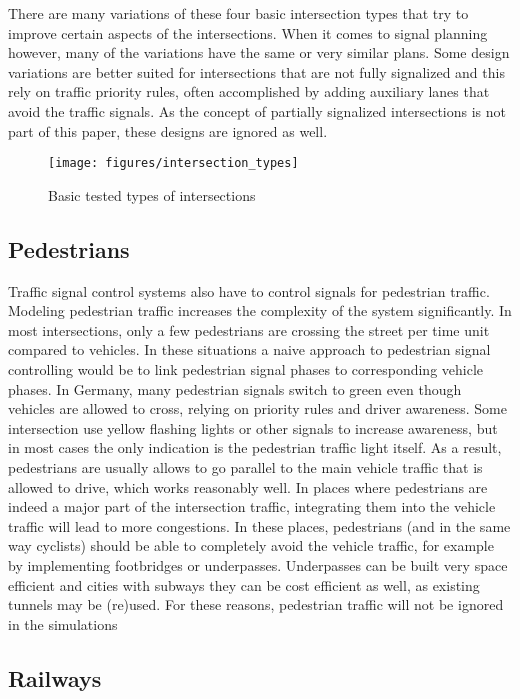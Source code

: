 There are many variations of these four basic intersection types that try to improve certain aspects of the intersections. When it comes to signal planning however, many of the variations have the same or very similar plans. Some design variations are better suited for intersections that are not fully signalized and this rely on traffic priority rules, often accomplished by adding auxiliary lanes that avoid the traffic signals. As the concept of partially signalized intersections is not part of this paper, these designs are ignored as well.

\begin{figure}[ht]
	\centering
	\texttt{[image: figures/intersection\_types]}
	\caption{Basic tested types of intersections}
	\label{intersection_types}
\end{figure}

\subsection*{Pedestrians}

Traffic signal control systems also have to control signals for pedestrian traffic. Modeling pedestrian traffic increases the complexity of the system significantly. In most intersections, only a few pedestrians are crossing the street per time unit compared to vehicles. In these situations a naive approach to pedestrian signal controlling would be to link pedestrian signal phases to corresponding vehicle phases. In Germany, many pedestrian signals switch to green even though vehicles are allowed to cross, relying on priority rules and driver awareness. Some intersection use yellow flashing lights or other signals to increase awareness, but in most cases the only indication is the pedestrian traffic light itself. As a result, pedestrians are usually allows to go parallel to the main vehicle traffic that is allowed to drive, which works reasonably well. In places where pedestrians are indeed a major part of the intersection traffic, integrating them into the vehicle traffic will lead to more congestions. In these places, pedestrians (and in the same way cyclists) should be able to completely avoid the vehicle traffic, for example by implementing footbridges or underpasses. Underpasses can be built very space efficient and cities with subways they can be cost efficient as well, as existing tunnels may be (re)used. For these reasons, pedestrian traffic will not be ignored in the simulations

\subsection*{Railways}

